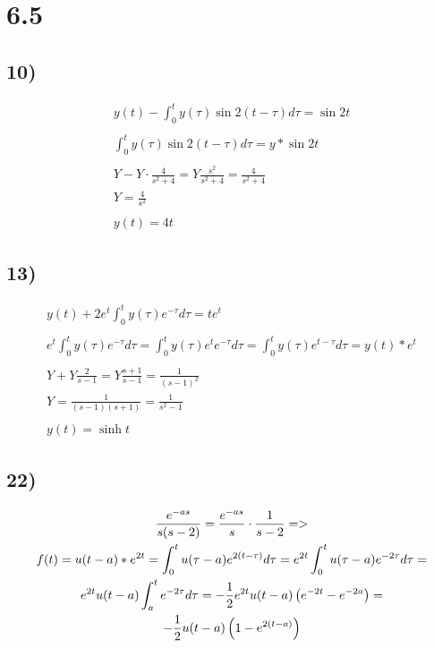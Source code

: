 \newpage

\section*{6.5}

\subsection*{10)}


\begin{gather*}
	y(t) - \int_0^t{y(\tau) \sin{2(t - \tau)} d\tau} = \sin{2 t} \\ \\
	\int_0^t{y(\tau) \sin{2(t - \tau)} d\tau} = y * \sin{2 t} \\ \\
	Y - Y \cdot \frac{4}{s^2 + 4} =
	Y \frac{s^2}{s^2 + 4} = \frac{4}{s^2 + 4} \\
	Y = \frac{4}{s^2} \\ \\
	y(t) = 4 t
\end{gather*}


\subsection*{13)}


\begin{gather*}
	y(t) + 2 e^t \int_0^t{y(\tau) e^{-\tau} d\tau} = t e^t \\ \\
	e^t \int_0^t{y(\tau) e^{-\tau} d\tau} =
	\int_0^t{y(\tau) e^t e^{-\tau} d\tau} = 
	\int_0^t{y(\tau) e^{t - \tau} d\tau} = y(t) * e^t \\ \\
	Y + Y \frac{2}{s - 1} = Y \frac{s + 1}{s - 1} = \frac{1}{(s - 1)^2} \\
	Y = \frac{1}{(s - 1) (s + 1)} =
	\frac{1}{s^2 - 1} \\ \\
	y(t) = \sinh{t}
\end{gather*}


\subsection*{22)}


\begin{gather*}
	\frac{e^{- a s}}{s (s - 2)} =
	\frac{e^{- a s}}{s} \cdot \frac{1}{s - 2} => \\
	f(t) = u(t - a) * e^{2 t} = \int_0^t{u(\tau - a) e^{2(t - \tau)} d\tau} =
	e^{2 t} \int_0^t{u(\tau - a) e^{-2 \tau} d \tau} = \\
	e^{2 t} u(t - a) \int_a^t{e^{-2 \tau} d \tau} =
	- \frac{1}{2} e^{2 t} u(t - a) \left( e^{-2 t} - e^{-2 a} \right) = \\
	- \frac{1}{2} u(t - a) \left( 1 - e^{2 (t - a)} \right)
\end{gather*}



